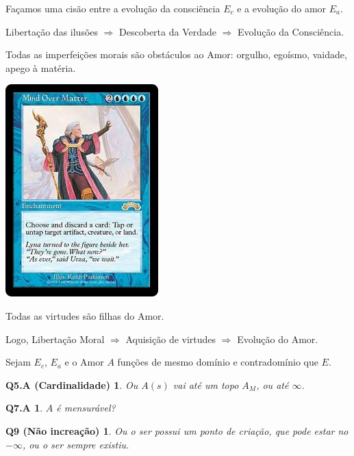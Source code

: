\documentclass[12pt,a4paper]{article}
\begin{document}
			Fa\c{c}amos uma cis\~ao entre a evolu\c{c}\~ao da consci\^encia $E_c$ e a evolu\c{c}\~ao do amor $E_a$.

			Liberta\c{c}\~ao das ilus\~oes $ \Rightarrow $ Descoberta da Verdade $ \Rightarrow $ Evolu\c{c}\~ao da Consci\^encia.

			Todas as imperfei\c{c}\~oes morais s\~ao obst\'aculos ao Amor: orgulho, ego\'ismo, vaidade, apego \`a mat\'eria.

			\begin{center}
			\includegraphics{mind}
			\end{center}

			Todas as virtudes s\~ao filhas do Amor.

			Logo, Liberta\c{c}\~ao Moral $ \Rightarrow $ Aquisi\c{c}\~ao de virtudes $ \Rightarrow $ Evolu\c{c}\~ao do Amor.

			Sejam $ E_c $, $ E_a $ e o Amor $A$ fun\c{c}\~oes de mesmo dom\'inio e contradom\'inio que $E$.

			\newtheorem{Q5.A}{Q5.A (Cardinalidade)}
			\begin{Q5.A} Ou $A(s)$ vai at\'e um topo $ A_M $, ou at\'e $ \infty $.
			\end{Q5.A}

			\newtheorem{Q7.A}{Q7.A}
			\begin{Q7.A} $A$ \'e mensur\'avel?
			\end{Q7.A}


			\newtheorem{Q9}{Q9 (N\~ao increa\c{c}\~ao)}
			\begin{Q9} Ou o ser possui um ponto de cria\c{c}\~ao, que pode estar no $ -\infty $, ou o ser sempre existiu.
			\end{Q9}
\end{document}
